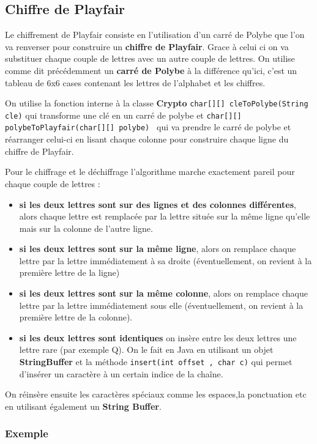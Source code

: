 \documentclass{article}
\begin{document}
\subsection{Chiffre de Playfair}

Le chiffrement de Playfair consiste en l'utilisation d'un carré de Polybe que l'on va renverser pour construire un \textbf{chiffre de Playfair}. Grace à celui ci on va substituer chaque couple de lettres avec un autre couple de lettres.
On utilise comme dit précédemment un \textbf{carré de Polybe} à la différence qu'ici, c'est un tableau de 6x6 cases contenant les lettres de l'alphabet et les chiffres. 

On utilise la fonction interne à la classe \textbf{Crypto} \verb+char[][] cleToPolybe(String cle)+ qui transforme une clé en un carré de polybe et \verb+char[][] polybeToPlayfair(char[][] polybe) + qui va prendre le carré de polybe et  réarranger celui-ci en lisant chaque colonne pour construire chaque ligne du chiffre de Playfair.

Pour le chiffrage et le déchiffrage l'algorithme marche exactement pareil pour chaque couple de lettres :
\begin{itemize}
\item \textbf{si les deux lettres sont sur des lignes et des colonnes différentes}, alors chaque lettre est remplacée par la lettre située sur la même ligne qu'elle mais sur la colonne de l'autre ligne.
\item \textbf{si les deux lettres sont sur la même ligne}, alors on remplace chaque lettre par la lettre immédiatement à sa droite (éventuellement, on revient à la première lettre de la ligne)
\item \textbf{si les deux lettres sont sur la même colonne}, alors on remplace chaque lettre par la lettre immédiatement sous elle (éventuellement, on revient à la première lettre de la colonne).
\item \textbf{si les deux lettres sont identiques} on insère entre les deux lettres une lettre rare (par exemple Q). On le fait en Java en utilisant un objet \textbf{StringBuffer} et la méthode \verb+insert(int offset , char c)+ qui permet d’insérer un caractère à un certain indice de la chaîne.
\end{itemize}

On réinsère ensuite les caractères spéciaux comme les espaces,la ponctuation etc en utilisant également un \textbf{String Buffer}. 

\subsubsection{Exemple}
\end{document}
